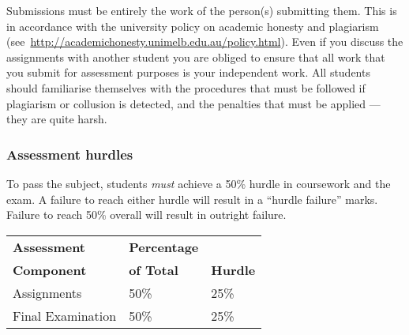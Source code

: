 \documentclass{article}
\begin{document}
Submissions must be entirely the work of the person(s)
submitting them. This is in accordance with the university policy on
academic honesty and plagiarism (see\
\url{http://academichonesty.unimelb.edu.au/policy.html}). Even
if you discuss the assignments with another student you are obliged to
ensure that all work that you submit for assessment purposes is your
independent work. All students should familiarise themselves with
the procedures that must be followed if plagiarism or collusion is
detected, and the penalties that must be applied --- they are quite
harsh.

\subsubsection*{Assessment hurdles}

To pass the subject, students {\em must} achieve a 50\% hurdle in
coursework and the exam. A failure to reach either hurdle will result
in a ``hurdle failure'' marks. Failure to reach 50\% overall will
result in outright failure.

\begin{center}
\begin{tabular}{lll}
 \textbf{Assessment} & \textbf{Percentage} & \\
 \textbf{Component}  & \textbf{of Total}   & \textbf{Hurdle} \\
 \hline\hline
 Assignments                       & 50\%                        & 25\%\\
 Final Examination               & 50\%                        & 25\% \\
\hline
\end{tabular}
\end{center}
\end{document}
